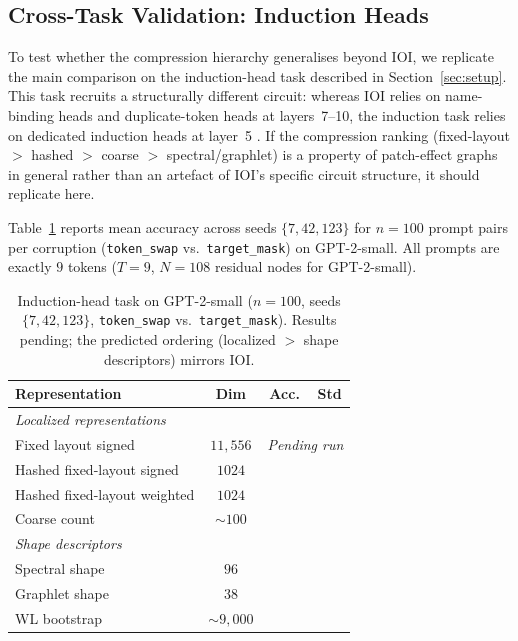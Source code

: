 \documentclass[11pt,a4paper]{article}
\begin{document}
\subsection{Cross-Task Validation: Induction Heads}
\label{sec:induction}

To test whether the compression hierarchy generalises beyond IOI, we replicate the main comparison on the induction-head task described in Section~\ref{sec:setup}. This task recruits a structurally different circuit: whereas IOI relies on name-binding heads and duplicate-token heads at layers~7--10, the induction task relies on dedicated induction heads at layer~5 \cite{olsson2022context}. If the compression ranking (fixed-layout $>$ hashed $>$ coarse $>$ spectral/graphlet) is a property of patch-effect graphs in general rather than an artefact of IOI's specific circuit structure, it should replicate here.

Table~\ref{tab:induction} reports mean accuracy across seeds $\{7, 42, 123\}$ for $n=100$ prompt pairs per corruption (\texttt{token\_swap} vs.\ \texttt{target\_mask}) on GPT-2-small. All prompts are exactly $9$ tokens ($T=9$, $N=108$ residual nodes for GPT-2-small).

\begin{table}[H]
\centering
\small
\begin{tabular}{lccc}
\toprule
\textbf{Representation} & \textbf{Dim} & \textbf{Acc.} & \textbf{Std} \\
\midrule
\multicolumn{4}{l}{\textit{Localized representations}} \\
Fixed layout signed & $11,\!556$ & \multicolumn{2}{c}{\textit{Pending run}} \\
Hashed fixed-layout signed & $1024$ & & \\
Hashed fixed-layout weighted & $1024$ & & \\
Coarse count & ${\sim}100$ & & \\
\midrule
\multicolumn{4}{l}{\textit{Shape descriptors}} \\
Spectral shape & $96$ & & \\
Graphlet shape & $38$ & & \\
WL bootstrap & ${\sim}9{,}000$ & & \\
\bottomrule
\end{tabular}
\caption{Induction-head task on GPT-2-small ($n=100$, seeds $\{7,42,123\}$, \texttt{token\_swap} vs.\ \texttt{target\_mask}). Results pending; the predicted ordering (localized $>$ shape descriptors) mirrors IOI.}
\label{tab:induction}
\end{table}
\end{document}
